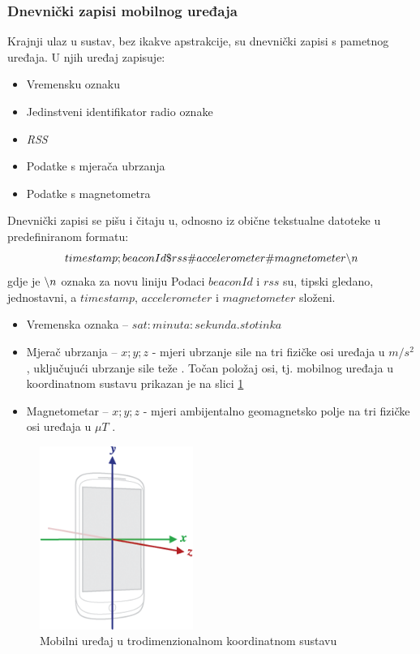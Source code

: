 \documentclass[times, utf8, diplomski, numeric]{fer}
\begin{document}
\subsubsection{Dnevnički zapisi mobilnog uređaja}
Krajnji ulaz u sustav, bez ikakve apstrakcije, su dnevnički zapisi  s
pametnog uređaja. U njih uređaj zapisuje:
\begin{itemize}
  \item Vremensku oznaku
  \item Jedinstveni identifikator radio oznake
  \item \emph{RSS} 
  \item Podatke s mjerača ubrzanja 
  \item Podatke s magnetometra 
\end{itemize}
Dnevnički zapisi se pišu i čitaju u, odnosno iz obične tekstualne datoteke u
predefiniranom formatu:
\begin{equation}
	\centering
	timestamp;beaconId\$rss\#accelerometer\#magnetometer\char`\\n
\end{equation}
gdje je $\char`\\n$ oznaka za novu liniju 
Podaci $beaconId$ i $rss$ su, tipski gledano, jednostavni, a $timestamp$,
$accelerometer$ i $magnetometer$ složeni.

\begin{itemize}
  \item Vremenska oznaka -- $sat:minuta:sekunda.stotinka$
  \item Mjerač ubrzanja -- $x;y;z$ - mjeri ubrzanje sile na tri fizičke osi
  uređaja u $m/s^2$, uključujući ubrzanje sile teže \cite{AndroidSensors}. Točan
  položaj osi, tj. mobilnog uređaja u koordinatnom sustavu prikazan je na slici
  \ref{fig:coordinates}
  \item Magnetometar -- $x;y;z$ - mjeri ambijentalno geomagnetsko polje na tri
  fizičke osi uređaja u $\mu T$ \cite{AndroidSensors}.
\end{itemize}

\begin{figure}[!htb]
	\centering
	\includegraphics[width=5cm]{images/coordinates.png}
	\caption{Mobilni uređaj u trodimenzionalnom koordinatnom sustavu}
	\label{fig:coordinates}
\end{figure}
\end{document}
